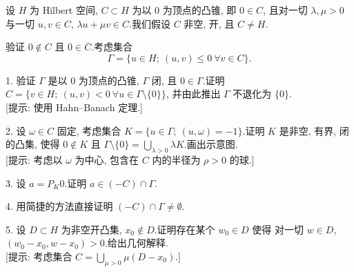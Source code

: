 \begin{problem}[第 1, 5 章]
\label{prob:25}
设 $H$ 为 Hilbert 空间, $C\subset H$ 为以 $0$ 为顶点的凸锥, 即 $0\in C$, 且对一切
$\lambda,\mu>0$ 与一切 $u,v\in C$, $\lambda u+\mu v\in C$.我们假设 $C$ 非空, 开,
且 $C\ne H$.

验证 $0\notin C$ 且 $0\in\overline C$.考虑集合
\begin{equation*}
\Gamma=\{u\in H;\ (u,v)\le0\ \forall v\in C\}.
\end{equation*}

1. 验证 $\Gamma$ 是以 $0$ 为顶点的凸锥, $\Gamma$ 闭, 且 $0\in\Gamma$.证明
$C=\{v\in H;\ (u,v)<0\ \forall u\in\Gamma\setminus\{0\}\}$, 并由此推出 $\Gamma$
不退化为 $\{0\}$.\\
{[提示: 使用 Hahn--Banach 定理.]}

2. 设 $\omega\in C$ 固定, 考虑集合 $K=\{u\in\Gamma;\ (u,\omega)=-1\}$.证明 $K$
是非空, 有界, 闭的凸集, 使得 $0\notin K$ 且
$\Gamma\setminus\{0\}=\bigcup_{\lambda>0}\lambda K$.画出示意图.\\
{[提示: 考虑以 $\omega$ 为中心, 包含在 $C$ 内的半径为 $\rho>0$ 的球.]}

3. 设 $a=P_K0$.证明 $a\in(-C)\cap\Gamma$.

4. 用简捷的方法直接证明 $(-C)\cap\Gamma\ne\emptyset$.

5. 设 $D\subset H$ 为非空开凸集, $x_0\notin D$.证明存在某个 $w_0\in D$ 使得
对一切 $w\in D$, $(w_0-x_0,w-x_0)>0$.给出几何解释.\\
{[提示: 考虑集合 $C=\bigcup_{\mu>0}\mu(D-x_0)$.]}
\end{problem}
